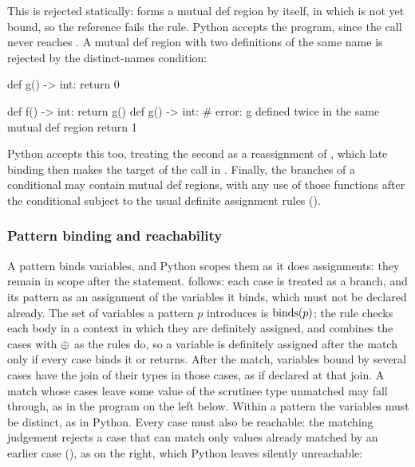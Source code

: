\noindent This is rejected statically:  forms a mutual def region by itself, in which 
is not yet bound, so the reference fails the  rule. Python accepts the program, since the
call  never reaches . A mutual def region with two definitions of the same name is
rejected by the distinct-names condition:

\begin{python}
def g() -> int:
    return 0

def f() -> int:
    return g()
def g() -> int:  # error: g defined twice in the same mutual def region
    return 1
\end{python}

\noindent Python accepts this too, treating the second  as a reassignment of ,
which late binding then makes the target of the call in . Finally, the branches of a conditional may contain mutual def regions, with any use of those
functions after the conditional subject to the usual definite assignment rules ().

\subsubsection{Pattern binding and reachability}
\label{sec:pattern-binding}

A  pattern binds variables, and Python scopes them as it does assignments: they remain in
scope after the  statement. \PurePy follows: each case is treated as a branch, and its pattern as an
assignment of the variables it binds, which must not be declared already. The set of variables a pattern $p$ introduces is $\binds(p)$; the
 rule checks each body in a context in which they are definitely assigned, and combines
the cases with $\merge$ as the  rules do, so a variable is definitely assigned after the match
only if every case binds it or returns. After the match, variables bound by several cases have the join of their
types in those cases, as if declared at that join. A match whose cases leave some value of the scrutinee type
unmatched may fall through, as in the program on the left below. Within a pattern the variables must be distinct,
as in Python. Every case must also be reachable: the matching judgement rejects a case that can match only values
already matched by an earlier case (), as on the right, which Python leaves
silently unreachable:

